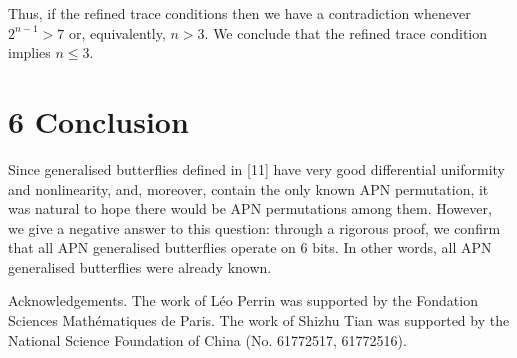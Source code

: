 \documentclass[10pt]{article}
\begin{document}
Thus, if the refined trace conditions then we have a contradiction whenever $2^{n-1}>7$ or, equivalently, $n>3$. We conclude that the refined trace condition implies $n \leq 3$.

\section*{6 Conclusion}
Since generalised butterflies defined in [11] have very good differential uniformity and nonlinearity, and, moreover, contain the only known APN permutation, it was natural to hope there would be APN permutations among them. However, we give a negative answer to this question: through a rigorous proof, we confirm that all APN generalised butterflies operate on 6 bits. In other words, all APN generalised butterflies were already known.

Acknowledgements. The work of Léo Perrin was supported by the Fondation Sciences Mathématiques de Paris. The work of Shizhu Tian was supported by the National Science Foundation of China (No. 61772517, 61772516).
\end{document}
